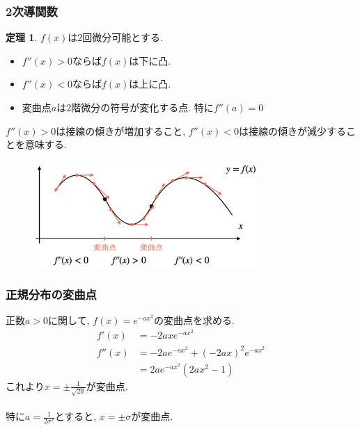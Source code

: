 \documentclass[dvipdfmx,cjk,10.2pt]{beamer}
\theoremstyle{definition}
\newtheorem{Thm}{定理}[section]
\begin{document}
\begin{frame}
\frametitle{2次導関数}
\vspace{-2mm}

\begin{Thm}
$f(x)$は$2$回微分可能とする. 
\begin{itemize}
\item $f''(x)>0$ならば$f(x)$は下に凸. 
\item $f''(x)<0$ならば$f(x)$は上に凸.
\item 変曲点$a$は$2$階微分の符号が変化する点. 特に$f''(a)=0$
\end{itemize}
\end{Thm}
$f''(x)>0$は接線の傾きが増加すること, $f''(x)<0$は接線の傾きが減少することを意味する. 

\vspace{-1mm}

 \begin{figure}[htbp]
 \begin{center} 
  \includegraphics[width=85mm]{inflection2.png}
 \end{center}
\end{figure}

\end{frame}





\begin{frame}
\frametitle{正規分布の変曲点}

正数$a>0$に関して, $f(x)=e^{-ax^2}$の変曲点を求める. 
\begin{align*}
f'(x) & = -2axe^{-ax^2} \\
f''(x) & = -2ae^{-ax^2} + (-2ax)^2e^{-ax^2} \\
&= 2ae^{-ax^2} (2ax^2-1)
\end{align*}
これより$x=\pm \frac{1}{\sqrt{2a}}$が変曲点. \\
\ \\

特に$a=\frac{1}{2\sigma^2}$とすると, $x=\pm \sigma$が変曲点. 

\end{frame}
\end{document}
